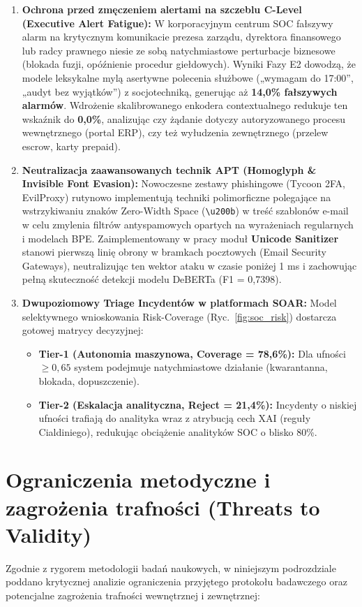 \documentclass[12pt,a4paper,twoside]{report}
\begin{document}
\begin{enumerate}[leftmargin=1.5em]
  \item \textbf{Ochrona przed zmęczeniem alertami na szczeblu C-Level (Executive Alert Fatigue):} W korporacyjnym centrum SOC fałszywy alarm na krytycznym komunikacie prezesa zarządu, dyrektora finansowego lub radcy prawnego niesie ze sobą natychmiastowe perturbacje biznesowe (blokada fuzji, opóźnienie procedur giełdowych). Wyniki Fazy E2 dowodzą, że modele leksykalne mylą asertywne polecenia służbowe („wymagam do 17:00”, „audyt bez wyjątków”) z socjotechniką, generując aż \textbf{14,0\% fałszywych alarmów}. Wdrożenie skalibrowanego enkodera contextualnego redukuje ten wskaźnik do \textbf{0,0\%}, analizując czy żądanie dotyczy autoryzowanego procesu wewnętrznego (portal ERP), czy też wyłudzenia zewnętrznego (przelew escrow, karty prepaid).

  \item \textbf{Neutralizacja zaawansowanych technik APT (Homoglyph \& Invisible Font Evasion):} Nowoczesne zestawy phishingowe (Tycoon 2FA, EvilProxy) rutynowo implementują techniki polimorficzne polegające na wstrzykiwaniu znaków Zero-Width Space (\texttt{\textbackslash u200b}) w treść szablonów e-mail w celu zmylenia filtrów antyspamowych opartych na wyrażeniach regularnych i modelach BPE. Zaimplementowany w pracy moduł \textbf{Unicode Sanitizer} stanowi pierwszą linię obrony w bramkach pocztowych (Email Security Gateways), neutralizując ten wektor ataku w czasie poniżej 1 ms i zachowując pełną skuteczność detekcji modelu DeBERTa (F1 = 0,7398).

  \item \textbf{Dwupoziomowy Triage Incydentów w platformach SOAR:} Model selektywnego wnioskowania Risk-Coverage (Ryc.~\ref{fig:soc_risk}) dostarcza gotowej matrycy decyzyjnej:
  \begin{itemize}
    \item \textbf{Tier-1 (Autonomia maszynowa, Coverage = 78,6\%):} Dla ufności $\ge 0,65$ system podejmuje natychmiastowe działanie (kwarantanna, blokada, dopuszczenie).
    \item \textbf{Tier-2 (Eskalacja analityczna, Reject = 21,4\%):} Incydenty o niskiej ufności trafiają do analityka wraz z atrybucją cech XAI (reguły Cialdiniego), redukując obciążenie analityków SOC o blisko 80\%.
  \end{itemize}
\end{enumerate}

\section{Ograniczenia metodyczne i zagrożenia trafności (Threats to Validity)}\label{sec:limitations}
Zgodnie z rygorem metodologii badań naukowych, w niniejszym podrozdziale poddano krytycznej analizie ograniczenia przyjętego protokołu badawczego oraz potencjalne zagrożenia trafności wewnętrznej i zewnętrznej:
\end{document}
